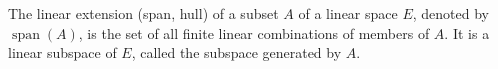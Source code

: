 The linear extension (span, hull) of a subset $A$ of a linear space $E$, denoted by $\operatorname{span}(A)$, is the set of all finite linear combinations of members of $A$. It is a linear subspace of $E$, called the subspace generated by $A$.
